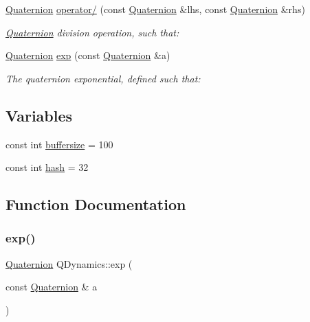 \begin{DoxyCompactItemize}
\hyperlink{classQDynamics_1_1Quaternion}{Quaternion} \hyperlink{namespaceQDynamics_a48d51b6fed1449d7e9a62dac20a169af}{operator/} (const \hyperlink{classQDynamics_1_1Quaternion}{Quaternion} \&lhs, const \hyperlink{classQDynamics_1_1Quaternion}{Quaternion} \&rhs)
\begin{DoxyCompactList}\small\item\em \hyperlink{classQDynamics_1_1Quaternion}{Quaternion} division operation, such that\+: \end{DoxyCompactList}\item 
\hyperlink{classQDynamics_1_1Quaternion}{Quaternion} \hyperlink{namespaceQDynamics_aa458e456eca06783fd8c41b7ac2b1400}{exp} (const \hyperlink{classQDynamics_1_1Quaternion}{Quaternion} \&a)
\begin{DoxyCompactList}\small\item\em The quaternion exponential, defined such that\+: \end{DoxyCompactList}\end{DoxyCompactItemize}
\subsection*{Variables}
\begin{DoxyCompactItemize}
\item 
const int \hyperlink{namespaceQDynamics_a06e91eeb11c659d8845569a642500675}{buffersize} = 100
\item 
const int \hyperlink{namespaceQDynamics_ac3ad3b89bbd65796d1f4f5e4809a12ed}{hash} = 32
\end{DoxyCompactItemize}


\subsection{Function Documentation}
\mbox{\label{namespaceQDynamics_aa458e456eca06783fd8c41b7ac2b1400}} 
\subsubsection{\texorpdfstring{exp()}{exp()}}
{\footnotesize\ttfamily \hyperlink{classQDynamics_1_1Quaternion}{Quaternion} Q\+Dynamics\+::exp (\begin{DoxyParamCaption}\item[{const \hyperlink{classQDynamics_1_1Quaternion}{Quaternion} \&}]{a }\end{DoxyParamCaption})\hspace{0.3cm}{\ttfamily [inline]}}



